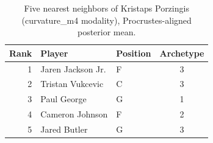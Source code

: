 \begin{table}[htbp]
  \centering\small
  \begin{tabular}{rllc}
    \toprule
    Rank & Player & Position & Archetype \\
    \midrule
    1 & Jaren Jackson Jr. & F & 3 \\
    2 & Tristan Vukcevic & C & 3 \\
    3 & Paul George & G & 1 \\
    4 & Cameron Johnson & F & 2 \\
    5 & Jared Butler & G & 3 \\
    \bottomrule
  \end{tabular}
  \caption{Five nearest neighbors of Kristaps Porzingis (curvature_m4 modality), Procrustes-aligned posterior mean.}
  \label{tab:Kristaps_Porzingis_neighbors_curvature_m4}
\end{table}

